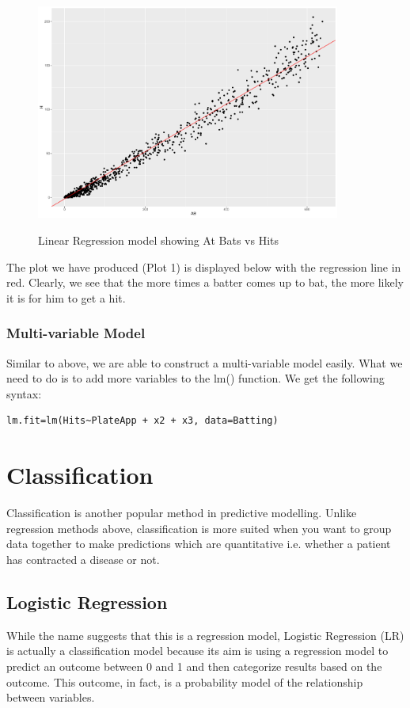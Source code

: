 \documentclass[11pt,a4paper]{report}
\begin{document}
\begin{figure}[bt]
    \caption{Linear Regression model showing At Bats vs Hits}
    \centering
    \includegraphics[width=10cm]{photographs/linreggg.pdf}
    \label{1}
\end{figure}
\bigskip
The plot we have produced (Plot 1) is displayed below with the regression line in red.
Clearly, we see that the more times a batter comes up to bat, the more likely it is for him to get a hit.

\subsubsection{Multi-variable Model}
Similar to above, we are able to construct a multi-variable model easily. What we need to do is to add more variables to the lm() function. We get the following syntax:

\begin{lstlisting}[basicstyle=\scriptsize]
lm.fit=lm(Hits~PlateApp + x2 + x3, data=Batting)
\end{lstlisting}




\section{Classification}
Classification is another popular method in predictive modelling. Unlike regression methods above, classification is more suited when you want to group data together to make predictions which are quantitative i.e. whether a patient has contracted a disease or not.

\subsection{Logistic Regression}
While the name suggests that this is a regression model, Logistic Regression (LR) is actually a classification model because its aim is using a regression model to predict an outcome between 0 and 1 and then categorize results based on the outcome. This outcome, in fact, is a probability model of the relationship between variables. 
\end{document}
